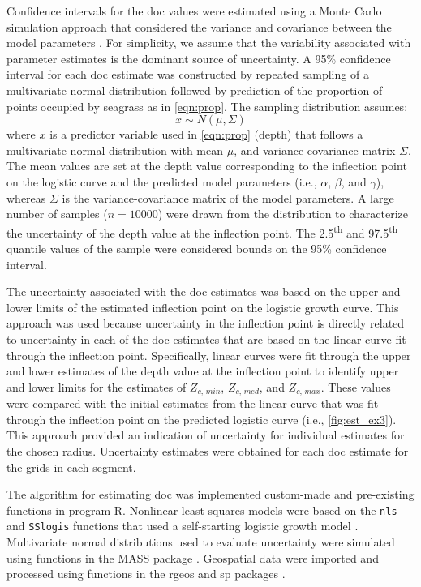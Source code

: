 \documentclass[letterpaper,12pt,oneside]{article}\usepackage[]{graphicx}\usepackage[]{color}
\begin{document}
Confidence intervals for the \ac{doc} values were estimated using a Monte Carlo simulation approach that considered the variance and covariance between the model parameters \citep{Hilborn97}.  For simplicity, we assume that the variability associated with parameter estimates is the dominant source of uncertainty.  A 95\% confidence interval for each \ac{doc} estimate was constructed by repeated sampling of a multivariate normal distribution followed by prediction of the proportion of points occupied by seagrass as in \cref{eqn:prop}.  The sampling distribution assumes:
\begin{equation}
x \sim N(\mu, \Sigma)
\end{equation}
\noindent where $x$ is a predictor variable used in \cref{eqn:prop} (depth) that follows a multivariate normal distribution with mean $\mu$, and variance-covariance matrix $\Sigma$.  The mean values are set at the depth value corresponding to the inflection point on the logistic curve and the predicted model parameters (i.e., $\alpha$, $\beta$, and $\gamma$), whereas $\Sigma$ is the variance-covariance matrix of the model parameters.  A large number of samples ($n = 10000$) were drawn from the distribution to characterize the uncertainty of the depth value at the inflection point.  The 2.5\textsuperscript{th} and 97.5\textsuperscript{th} quantile values of the sample were considered bounds on the 95\% confidence interval.

The uncertainty associated with the \ac{doc} estimates was based on the upper and lower limits of the estimated inflection point on the logistic growth curve.  This approach was used because uncertainty in the inflection point is directly related to uncertainty in each of the \ac{doc} estimates that are based on the linear curve fit through the inflection point.   Specifically, linear curves were fit through the upper and lower estimates of the depth value at the inflection point to identify upper and lower limits for the estimates of $Z_{c,\,min}$, $Z_{c,\,med}$, and $Z_{c,\,max}$.  These values were compared with the initial estimates from the linear curve that was fit through the inflection point on the predicted logistic curve (i.e., \cref{fig:est_ex3}).  This approach provided an indication of uncertainty for individual estimates for the chosen radius.  Uncertainty estimates were obtained for each \ac{doc} estimate for the grids in each segment.

The algorithm for estimating \ac{doc} was implemented custom-made and pre-existing functions in program R.  Nonlinear least squares models were based on the \texttt{nls} and \texttt{SSlogis} functions that used a self-starting logistic growth model \citep{Bates92,RDCT14}.  Multivariate normal distributions used to evaluate uncertainty were simulated using functions in the MASS package \citep{Venables02}.  Geospatial data were imported and processed using functions in the rgeos and sp packages \citep{Bivand08,Bivand14}.  
\end{document}
